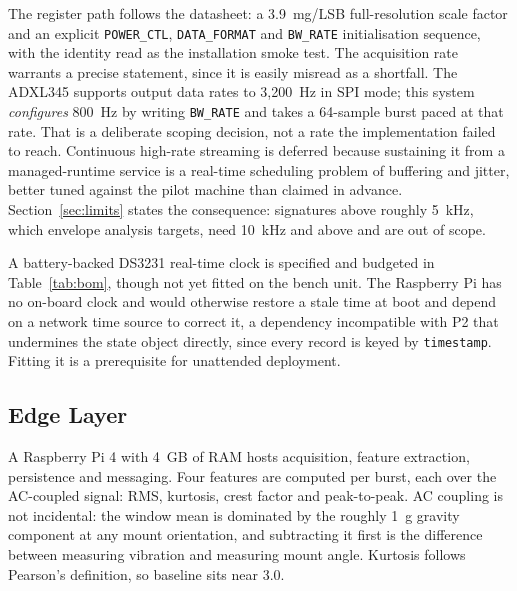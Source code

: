\documentclass[conference]{IEEEtran}
\begin{document}
The register path follows the datasheet: a 3.9~mg/LSB full-resolution scale
factor and an explicit \texttt{POWER\_CTL}, \texttt{DATA\_FORMAT} and
\texttt{BW\_RATE} initialisation sequence, with the identity read as the
installation smoke test. The acquisition rate warrants a precise statement,
since it is easily misread as a shortfall. The ADXL345 supports output data
rates to 3,200~Hz in SPI mode; this system \emph{configures} 800~Hz by
writing \texttt{BW\_RATE} and takes a 64-sample burst paced at that rate.
That is a deliberate scoping decision, not a rate the implementation failed
to reach. Continuous high-rate streaming is deferred because sustaining it
from a managed-runtime service is a real-time scheduling problem of
buffering and jitter, better tuned against the pilot machine than claimed in
advance. Section~\ref{sec:limits} states the consequence: signatures above
roughly 5~kHz, which envelope analysis \cite{b9} targets, need 10~kHz and
above and are out of scope.

A battery-backed DS3231 real-time clock is specified and budgeted in
Table~\ref{tab:bom}, though not yet fitted on the bench unit. The Raspberry
Pi has no on-board clock and would otherwise restore a stale time at boot
and depend on a network time source to correct it, a dependency incompatible
with P2 that undermines the state object directly, since every record is
keyed by \texttt{timestamp}. Fitting it is a prerequisite for unattended
deployment.

\subsection{Edge Layer}

A Raspberry Pi 4 with 4~GB of RAM hosts acquisition, feature extraction,
persistence and messaging. Four features are computed per burst, each over
the AC-coupled signal: RMS, kurtosis, crest factor and peak-to-peak. AC
coupling is not incidental: the window mean is dominated by the roughly 1~g
gravity component at any mount orientation, and subtracting it first is the
difference between measuring vibration and measuring mount angle. Kurtosis
follows Pearson's definition, so baseline sits near 3.0.
\end{document}
